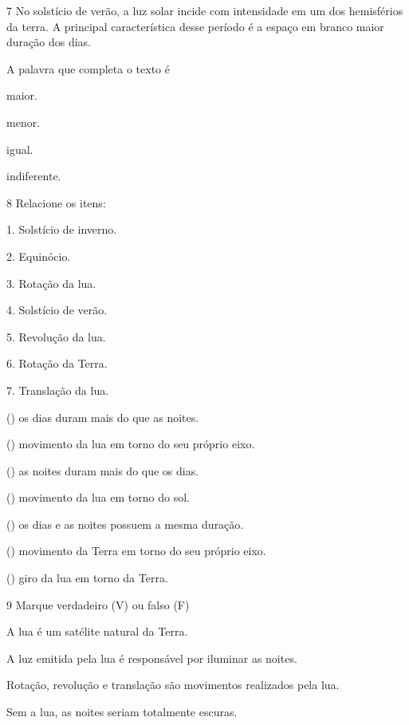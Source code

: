 \num{7} No solstício de verão, a luz solar incide com \preencher{}
intensidade em um dos hemisférios da terra. A principal característica
desse período é a espaço em branco maior duração dos dias.

A palavra que completa o texto é

\begin{escolha}
\item maior.

\item menor.

\item igual.

\item indiferente.
\end{escolha}


\num{8} Relacione os itens:

\begin{multicols}{1}
1. Solstício de inverno.

2. Equinócio.

3. Rotação da lua.

4. Solstício de verão.

5. Revolução da lua.

6. Rotação da Terra.

7. Translação da lua.

\columnbreak

() os dias duram mais do que as noites.

() movimento da lua em torno do seu próprio eixo.

() as noites duram mais do que os dias.

() movimento da lua em torno do sol.

() os dias e as noites possuem a mesma duração.

() movimento da Terra em torno do seu próprio eixo.

() giro da lua em torno da Terra.
\end{multicols}


\num{9} Marque verdadeiro (V) ou falso (F)

\begin{boxlist}
\item A lua é um satélite natural da Terra. 

\item A luz emitida pela lua é responsável por iluminar as noites. 

\item Rotação, revolução e translação são movimentos realizados pela lua. 

\item Sem a lua, as noites seriam totalmente escuras. 
\end{boxlist}

